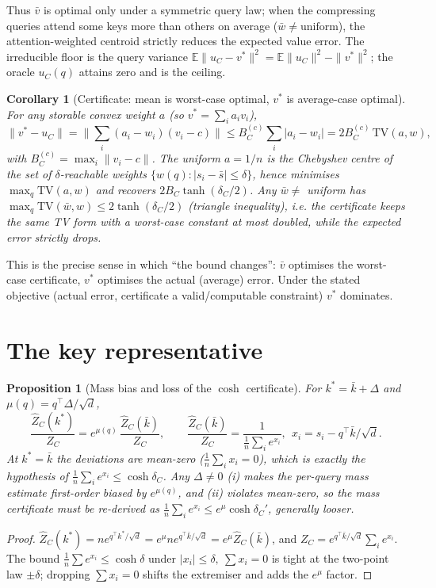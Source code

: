\documentclass[11pt]{article}
\newtheorem{proposition}{Proposition}
\newtheorem{corollary}{Corollary}
\begin{document}
Thus $\bar v$ is optimal only under a symmetric query law; when the compressing queries
attend some keys more than others on average ($\bar w\neq\text{uniform}$), the
attention-weighted centroid strictly reduces the expected value error. The irreducible
floor is the query variance $\mathbb E\|u_C-v^\ast\|^2 = \mathbb E\|u_C\|^2-\|v^\ast\|^2$;
the oracle $u_C(q)$ attains zero and is the ceiling.

\begin{corollary}[Certificate: mean is worst-case optimal, $v^\ast$ is average-case optimal]
\label{cor:value-cert}
For any storable convex weight $a$ (so $v^\ast=\sum_i a_i v_i$),
\[
  \|v^\ast-u_C\| = \Big\|\sum_i (a_i-w_i)(v_i-c)\Big\| \le B_C^{(c)}\sum_i|a_i-w_i|
    = 2B_C^{(c)}\,\mathrm{TV}(a,w),
\]
with $B_C^{(c)}=\max_i\|v_i-c\|$. The uniform $a=1/n$ is the Chebyshev centre of the set
of $\delta$-reachable weights $\{w(q):|s_i-\bar s|\le\delta\}$, hence minimises
$\max_q\mathrm{TV}(a,w)$ and recovers $2B_C\tanh(\delta_C/2)$. Any $\bar w\neq$ uniform has
$\max_q\mathrm{TV}(\bar w,w)\le 2\tanh(\delta_C/2)$ (triangle inequality), i.e. the
certificate keeps the same TV form with a worst-case constant at most doubled, while the
\emph{expected} error strictly drops.
\end{corollary}

This is the precise sense in which ``the bound changes'': $\bar v$ optimises the
worst-case certificate, $v^\ast$ optimises the actual (average) error. Under the stated
objective (actual error, certificate a valid/computable constraint) $v^\ast$ dominates.

\section{The key representative}

\begin{proposition}[Mass bias and loss of the $\cosh$ certificate]\label{prop:key}
For $k^\ast=\bar k+\Delta$ and $\mu(q)=q^\top\Delta/\sqrt d$,
\[
  \frac{\hat Z_C(k^\ast)}{Z_C} = e^{\mu(q)}\,\frac{\hat Z_C(\bar k)}{Z_C},\qquad
  \frac{\hat Z_C(\bar k)}{Z_C}=\frac{1}{\tfrac1n\sum_i e^{x_i}},\ \ x_i=s_i-q^\top\bar k/\sqrt d .
\]
At $k^\ast=\bar k$ the deviations are mean-zero ($\frac1n\sum_i x_i=0$), which is exactly
the hypothesis of $\frac1n\sum_i e^{x_i}\le\cosh\delta_C$. Any $\Delta\neq0$ (i) makes the
per-query mass estimate first-order biased by $e^{\mu(q)}$, and (ii) violates mean-zero, so
the mass certificate must be re-derived as $\frac1n\sum_i e^{x_i}\le e^{\mu}\cosh\delta_C'$,
generally looser.
\end{proposition}
\begin{proof}
$\hat Z_C(k^\ast)=n e^{q^\top k^\ast/\sqrt d}=e^{\mu} n e^{q^\top\bar k/\sqrt d}
=e^{\mu}\hat Z_C(\bar k)$, and $Z_C=e^{q^\top\bar k/\sqrt d}\sum_i e^{x_i}$. The bound
$\frac1n\sum e^{x_i}\le\cosh\delta$ under $|x_i|\le\delta,\ \sum x_i=0$ is tight at the
two-point law $\pm\delta$; dropping $\sum x_i=0$ shifts the extremiser and adds the $e^\mu$
factor.
\end{proof}
\end{document}
